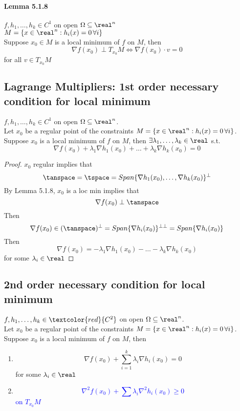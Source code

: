 \documentclass[11pt]{article}
\begin{document}
\paragraph{Lemma 5.1.8}
$f, h_1, \hdots, h_k \in C^1$ on open $\Omega \subseteq \real^n$ \\
$ M = \{ x \in \real^n: h_i(x) = 0 \, \forall i\}$ \\
Suppose $x_0 \in M$ is a local minimum of $f$ on $M$, then
$$\nabla f(x_0) \perp T_{x_0}M \iff \nabla f(x_0)\cdot v = 0$$ for all $v \in T_{x_0}M$

\subsection{Lagrange Multipliers: 1st order necessary condition for local minimum}
$f, h_1, \hdots, h_k \in C^1$ on open $\Omega \subseteq \real^n$. \\
Let $x_0$ be a regular point of the constraints $ M = \{ x \in \real^n: h_i(x) = 0 \, \forall i\}$. \\
Suppose $x_0$ is a local minimum of $f$ on $M$, then $\exists \lambda_1, \hdots, \lambda_k \in \real$ s.t.
$$\nabla f(x_0) + \lambda_1 \nabla h_1(x_0) + \hdots + \lambda_k \nabla h_k(x_0) = 0$$
\begin{proof}
	$x_0$ regular implies that $$\tanspace = \tspace = Span\{\nabla h_1(x_0), \hdots, \nabla h_k(x_0)\}^\perp$$
	By Lemma 5.1.8, $x_0$ is a loc min implies that $$\nabla f(x_0) \perp \tanspace$$
	Then $$\nabla f(x_0) \in (\tanspace)^\perp = Span\{\nabla h_i (x_0)\}^{\perp\perp} = Span\{ \nabla h_i(x_0)\}$$
	Then 
	$$\nabla f(x_0) = -\lambda_1 \nabla h_1(x_0) - \hdots - \lambda_k \nabla h_k(x_0)$$
	for some $\lambda_i \in \real$
\end{proof} 

\subsection{2nd order necessary condition for local minimum}
$f, h_1, \hdots, h_k \in \textcolor{red}{C^2}$ on open $\Omega \subseteq \real^n$. \\
Let $x_0$ be a regular point of the constraints $ M = \{ x \in \real^n: h_i(x) = 0 \, \forall i\}$. \\
Suppose $x_0$ is a local minimum of $f$ on $M$, then
\begin{enumerate}
	\item $$\nabla f(x_0) + \sum_{i=1}^k \lambda_i \nabla h_i(x_0) = 0$$
	for some $\lambda_i \in \real$
	\item \textcolor{blue}{$$\nabla^2 f(x_0) + \sum \lambda_i \nabla^2 h_i(x_0) \geq 0$$ on $T_{x_0}M$}
\end{enumerate}
\end{document}
